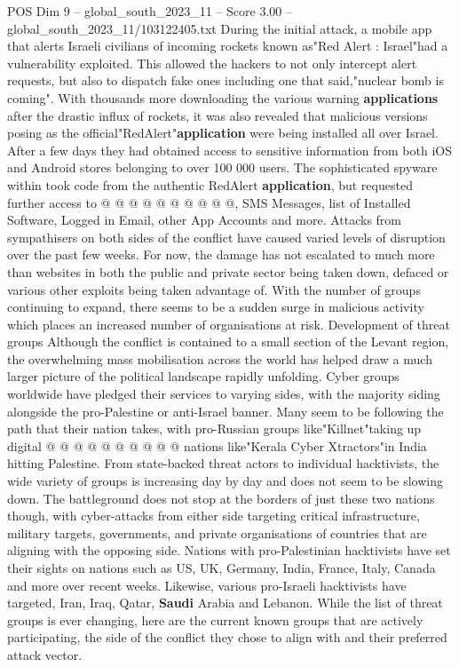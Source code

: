 \begin{textsample}{POS Dim 9 – global\_south\_2023\_11 – Score 3.00 – global\_south\_2023\_11/103122405.txt}
During the initial attack, a mobile app that alerts Israeli civilians of incoming rockets known as"Red Alert : Israel"had a vulnerability exploited.
This allowed the hackers to not only intercept alert requests, but also to dispatch fake ones including one that said,"nuclear bomb is coming".
With thousands more downloading the various warning \textbf{applications} after the drastic influx of rockets, it was also revealed that malicious versions posing as the official"RedAlert"\textbf{application} were being installed all over Israel.
After a few days they had obtained access to sensitive information from both iOS and Android stores belonging to over 100 000 users.
The sophisticated spyware within took code from the authentic RedAlert \textbf{application}, but requested further access to @ @ @ @ @ @ @ @ @ @, SMS Messages, list of Installed Software, Logged in Email, other App Accounts and more.
Attacks from sympathisers on both sides of the conflict have caused varied levels of disruption over the past few weeks.
For now, the damage has not escalated to much more than websites in both the public and private sector being taken down, defaced or various other exploits being taken advantage of.
With the number of groups continuing to expand, there seems to be a sudden surge in malicious activity which places an increased number of organisations at risk.
Development of threat groups Although the conflict is contained to a small section of the Levant region, the overwhelming mass mobilisation across the world has helped draw a much larger picture of the political landscape rapidly unfolding.
Cyber groups worldwide have pledged their services to varying sides, with the majority siding alongside the pro-Palestine or anti-Israel banner.
Many seem to be following the path that their nation takes, with pro-Russian groups like"Killnet"taking up digital @ @ @ @ @ @ @ @ @ @ nations like"Kerala Cyber Xtractors"in India hitting Palestine.
From state-backed threat actors to individual hacktivists, the wide variety of groups is increasing day by day and does not seem to be slowing down.
The battleground does not stop at the borders of just these two nations though, with cyber-attacks from either side targeting critical infrastructure, military targets, governments, and private organisations of countries that are aligning with the opposing side.
Nations with pro-Palestinian hacktivists have set their sights on nations such as US, UK, Germany, India, France, Italy, Canada and more over recent weeks.
Likewise, various pro-Israeli hacktivists have targeted, Iran, Iraq, Qatar, \textbf{Saudi} Arabia and Lebanon.
While the list of threat groups is ever changing, here are the current known groups that are actively participating, the side of the conflict they chose to align with and their preferred attack vector.

\end{textsample}
